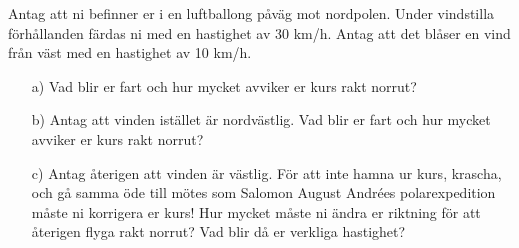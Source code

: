 Antag att ni befinner er i en luftballong påväg mot nordpolen. Under vindstilla förhållanden färdas ni med en hastighet av 30 km/h. Antag att det blåser en vind från väst med en hastighet av 10 km/h.
\begin{itemize}
\item[a) ] Vad blir er fart och hur mycket avviker er kurs rakt norrut?
\item[b) ] Antag att vinden istället är nordvästlig. Vad blir er fart och hur mycket avviker er kurs rakt norrut?
\item[c) ] Antag återigen att vinden är västlig. För att inte hamna ur kurs, krascha, och gå samma öde till mötes som Salomon August Andrées polarexpedition måste ni korrigera er kurs! Hur mycket måste ni ändra er riktning för att återigen flyga rakt norrut? Vad blir då er verkliga hastighet?
\end{itemize}
